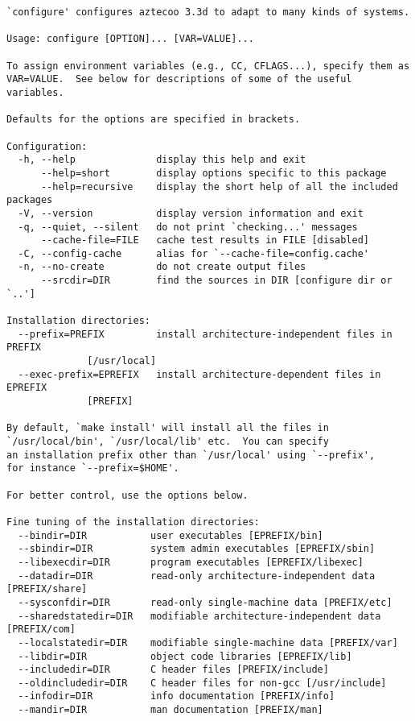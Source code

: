 \begin{Verbatim}
`configure' configures aztecoo 3.3d to adapt to many kinds of systems.

Usage: configure [OPTION]... [VAR=VALUE]...

To assign environment variables (e.g., CC, CFLAGS...), specify them as
VAR=VALUE.  See below for descriptions of some of the useful variables.

Defaults for the options are specified in brackets.

Configuration:
  -h, --help              display this help and exit
      --help=short        display options specific to this package
      --help=recursive    display the short help of all the included packages
  -V, --version           display version information and exit
  -q, --quiet, --silent   do not print `checking...' messages
      --cache-file=FILE   cache test results in FILE [disabled]
  -C, --config-cache      alias for `--cache-file=config.cache'
  -n, --no-create         do not create output files
      --srcdir=DIR        find the sources in DIR [configure dir or `..']

Installation directories:
  --prefix=PREFIX         install architecture-independent files in PREFIX
			  [/usr/local]
  --exec-prefix=EPREFIX   install architecture-dependent files in EPREFIX
			  [PREFIX]

By default, `make install' will install all the files in
`/usr/local/bin', `/usr/local/lib' etc.  You can specify
an installation prefix other than `/usr/local' using `--prefix',
for instance `--prefix=$HOME'.

For better control, use the options below.

Fine tuning of the installation directories:
  --bindir=DIR           user executables [EPREFIX/bin]
  --sbindir=DIR          system admin executables [EPREFIX/sbin]
  --libexecdir=DIR       program executables [EPREFIX/libexec]
  --datadir=DIR          read-only architecture-independent data [PREFIX/share]
  --sysconfdir=DIR       read-only single-machine data [PREFIX/etc]
  --sharedstatedir=DIR   modifiable architecture-independent data [PREFIX/com]
  --localstatedir=DIR    modifiable single-machine data [PREFIX/var]
  --libdir=DIR           object code libraries [EPREFIX/lib]
  --includedir=DIR       C header files [PREFIX/include]
  --oldincludedir=DIR    C header files for non-gcc [/usr/include]
  --infodir=DIR          info documentation [PREFIX/info]
  --mandir=DIR           man documentation [PREFIX/man]


\end{Verbatim}
